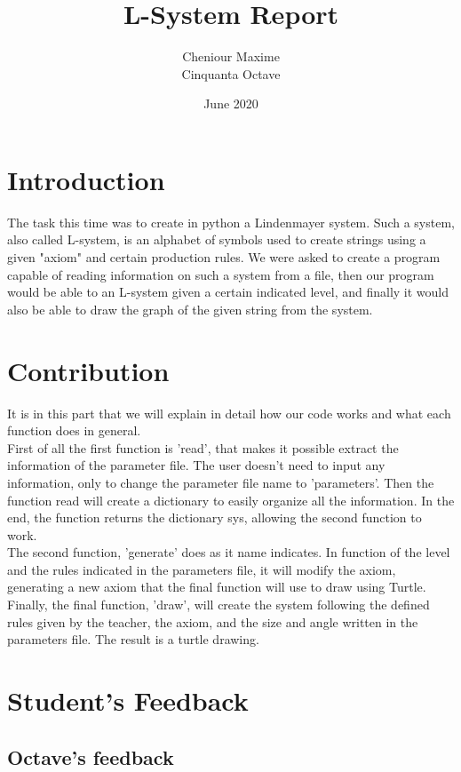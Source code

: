 \documentclass{article}
\title{L-System Report}
\author{Cheniour Maxime \\ Cinquanta Octave}
\date{June 2020}
\begin{document}
\maketitle

\tableofcontents

\section{Introduction}

The task this time was to create in python a Lindenmayer system. Such a system, also called L-system, is an alphabet of symbols used to create strings using a given "axiom" and certain production rules. We were asked to create a program capable of reading information on such a system from a file, then our program would be able to an L-system given a certain indicated level, and finally it would also be able to draw the graph of the given string from the system.

\section{Contribution}
It is in this part that we will explain in detail how our code works and what each function does in general. \\
First of all the first function is 'read', that makes it possible extract the information of the parameter file. The user doesn't need to input any information, only to change the parameter file name to 'parameters'. Then the function read will create a dictionary to easily organize all the information. In the end, the function returns the dictionary sys, allowing the second function to work.\\
The second function, 'generate' does as it name indicates. In function of the level and the rules indicated in the parameters file, it will modify the axiom, generating a new axiom that the final function will use to draw using Turtle.\\
Finally, the final function, 'draw', will create the system following the defined rules given by the teacher, the axiom, and the size and angle written in the parameters file. The result is a turtle drawing.

\section{Student's Feedback}
\subsection{Octave's feedback}
\end{document}
